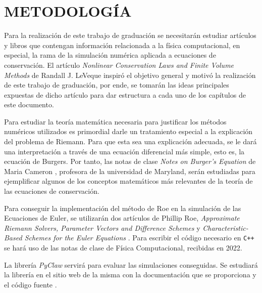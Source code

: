 \chapter{METODOLOGÍA}
Para la realización de este trabajo de graduación se necesitarán estudiar artículos y libros que contengan información relacionada a la física computacional, en especial, la rama de la simulación numérica aplicada a ecuaciones de conservación. El artículo \textit{Nonlinear Conservation Laws and Finite Volume Methods} de Randall J. LeVeque \cite{Leveque} inspiró el objetivo general y motivó la realización de este trabajo de graduación, por ende, se tomarán las ideas principales expuestas de dicho artículo para dar estructura a cada uno de los capítulos de este documento. 

Para estudiar la teoría matemática necesaria para justificar los métodos numéricos utilizados es primordial darle un tratamiento especial a la explicación del problema de Riemann. Para que esta sea una explicación adecuada, se le dará una interpretación a través de una ecuación diferencial más simple, esto es, la ecuación de Burgers. Por tanto, las notas de clase \textit{Notes on Burger's Equation} de Maria Cameron \cite{Cameron}, profesora de la universidad de Maryland, serán estudiadas para ejemplificar algunos de los conceptos matemáticos más relevantes de la teoría de las ecuaciones de conservación.

Para conseguir la implementación del método de Roe en la simulación de las Ecuaciones de Euler, se utilizarán dos artículos de Phillip Roe,  \textit{Approximate Riemann Solvers, Parameter Vectors and Difference Schemes} \cite{Roe81} y \textit{Characteristic-Based Schemes for the Euler Equations} \cite{Roe86}. Para escribir el código necesario en \texttt{C++} se hará uso de las notas de clase de Física Computacional, recibidas en 2022.

La librería \textit{PyClaw} servirá para evaluar las simulaciones conseguidas. Se estudiará la librería en el sitio web de la misma con la documentación que se proporciona y el código fuente \cite{clawpack}. 